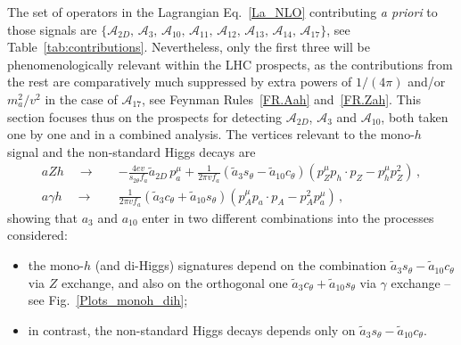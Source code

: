 \documentclass[11pt]{article}
\newcommand{\g}{\gamma}
\newcommand{\A}{\mathcal{A}}
\newcommand{\at}{\tilde{a}}
\newcommand{\st}{s_\theta}
\newcommand{\ct}{c_\theta}
\newcommand{\sdt}{s_{2\theta}}
\renewcommand{\to}{\rightarrow}
\renewcommand{\[}{\begin{equation}}
\renewcommand{\]}{\end{equation}}
\begin{document}
The set of operators in the Lagrangian  Eq.~\eqref{La_NLO} contributing {\it a priori} to those signals are 
$\{\A_{2D},\,\A_{3},\,\A_{10},\,\A_{11},\,\A_{12},\,\A_{13},\,\A_{14},\,\A_{17}\}$, see  Table~\ref{tab:contributions}. Nevertheless, only 
the first three will be phenomenologically relevant within the LHC prospects, as the contributions from the rest are comparatively much suppressed by extra 
powers of $1/(4\pi)$ and/or $m_a^2/v^2$ in the case of $\A_{17}$, see Feynman Rules~\ref{FR.Aah} and~\ref{FR.Zah}. This section focuses thus on the prospects for detecting $\A_{2D}$, $\A_3$ and $\A_{10}$, both taken one by one and in a combined analysis. 
The vertices relevant to the mono-$h$ signal and the non-standard Higgs decays are
\begin{equation}\label{anonima}
\begin{aligned}
a Z h \quad\to\quad&-\frac{4e v}{ \sdt  f_a}
\at_{2D}\, p_a^\mu+
\frac{1}{2\pi v f_a}(\at_3\st-\at_{10}\ct)(p_Z^\mu p_h\cdot p_Z-p_h^\mu p_Z^2)\,,\\
a \g h \quad\to\quad&\frac{1}{2\pi v f_a}(\at_3\ct+\at_{10}\st)\left(p_A^\mu p_a\cdot p_A-p_A^2 p_a^\mu\right)\,,
\end{aligned}
\end{equation}
showing that $a_3$ and $a_{10}$ enter  in two different combinations into the processes considered:
\begin{itemize}
\item   the mono-$h$ (and di-Higgs) signatures depend on the combination $\at_3\st-\at_{10}\ct$ via $Z$ exchange, and also on the orthogonal 
one $\at_3\ct+\at_{10}\st$ via $\gamma$ exchange -- see Fig.~\ref{Plots_monoh_dih};
\item  in contrast, the non-standard Higgs decays depends only on $\at_3\st-\at_{10}\ct$.
\end{itemize}
\end{document}
